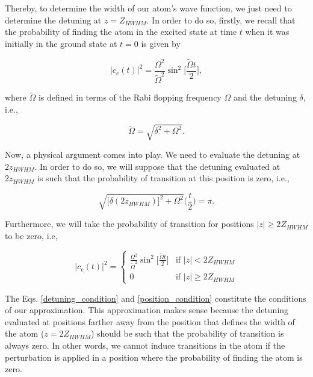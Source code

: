 \documentclass{article}
\begin{document}
Thereby, to determine the width of our atom's wave function, we just need to determine the detuning at $z = Z_{HWHM}$. In order to do so, firstly, we recall that the probability of finding the atom in the excited state at time $t$ when it was initially in the ground state at $t=0$ is given by

\begin{equation}\label{rabi_oscillations_exact}
  |c_{e}(t)|^{2} =\frac{\Omega^{2}}{\tilde{\Omega}^{2}} \sin^{2}\bigg[\frac{\tilde{\Omega} t}{2} \bigg],
\end{equation}

where $\tilde{\Omega}$ is defined in terms of the Rabi flopping frequency $\Omega$ and the detuning $\delta$, i.e.,

\begin{equation}
  \tilde{\Omega} = \sqrt{\delta^{2} + \Omega^{2}}.
\end{equation}

Now, a physical argument comes into play. We need to evaluate the detuning at $2z_{HWHM}$. In order to do so, we will suppose that the detuning evaluated at $2z_{HWHM}$ is such that the probability of transition at this position  is zero, i.e.,

\begin{equation}\label{detuning_condition}
\sqrt{\big[ \delta (2z_{HWHM}) \big]^{2} + \Omega^{2}} \bigg( \frac{t}{2} \bigg) = \pi.
\end{equation}

Furthermore, we will take the probability of transition for positions $|z| \ge 2 Z_{HWHM}$ to be zero, i.e,

\begin{equation}\label{position_condition}
|c_{e}(t)|^{2} =
    \begin{cases}
        \frac{\Omega^{2}}{\tilde{\Omega}^{2}} \sin^{2}\bigg[\frac{\tilde{\Omega} t}{2} \bigg] & \text{if } |z| < 2 Z_{HWHM}\\
        0 & \text{if } |z| \ge 2 Z_{HWHM}
    \end{cases}
\end{equation}

The Eqs. \ref{detuning_condition} and \ref{position_condition} constitute the conditions of our approximation. This approximation makes sense because the detuning evaluated at positions farther away from the position that defines the width of the atom ($z=2Z_{HWHM}$) should be such that the probability of transition is always zero. In other words, we cannot induce transitions in the atom if the perturbation is applied in a position where the probability of finding the atom is zero.
\end{document}
